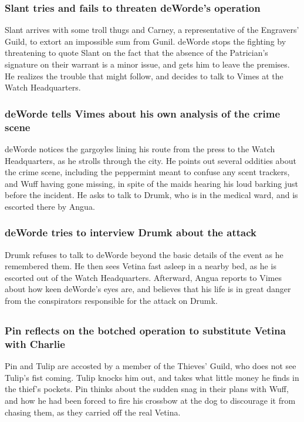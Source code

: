 \subsubsection{\Gls{Slant} tries and fails to threaten \Gls{deWorde}'s operation}
\Gls{Slant} arrives with some troll thugs and \Gls{Carney}, a representative of the Engravers'
Guild, to extort an impossible sum from \Gls{Gunil}. \Gls{deWorde} stops the fighting by threatening
to quote \Gls{Slant} on the fact that the absence of the Patrician's signature on their warrant is
a minor issue, and gets him to leave the premises. He realizes the trouble that might follow, and
decides to talk to \Gls{Vimes} at the Watch Headquarters.

\subsubsection{\Gls{deWorde} tells \Gls{Vimes} about his own analysis of the crime scene}
\Gls{deWorde} notices the gargoyles lining his route from the press to the Watch Headquarters, as
he strolls through the city. He points out several oddities about the crime scene, including the
peppermint meant to confuse any scent trackers, and \Gls{Wuff} having gone missing, in spite of
the maids hearing his loud barking just before the incident. He asks to talk to \Gls{Drumk}, who is
in the medical ward, and is escorted there by \Gls{Angua}.

\subsubsection{\Gls{deWorde} tries to interview \Gls{Drumk} about the attack}
\Gls{Drumk} refuses to talk to \Gls{deWorde} beyond the basic details of the event as he remembered
them. He then sees \Gls{Vetina} fast asleep in a nearby bed, as he is escorted out of the Watch
Headquarters. Afterward, \Gls{Angua} reports to \Gls{Vimes} about how keen \Gls{deWorde}'s eyes are,
and believes that his life is in great danger from the conspirators responsible for the attack on
\Gls{Drumk}.

\subsection{}
\subsubsection{\Gls{Pin} reflects on the botched operation to substitute \Gls{Vetina} with
    \Gls{Charlie}}
\Gls{Pin} and \Gls{Tulip} are accosted by a member of the Thieves' Guild, who does not see
\Gls{Tulip}'s fist coming. \Gls{Tulip} knocks him out, and takes what little money he finds in the
thief's pockets. \Gls{Pin} thinks about the sudden snag in their plans with \Gls{Wuff}, and how
he had been forced to fire his crossbow at the dog to discourage it from chasing them, as they
carried off the real \Gls{Vetina}.

